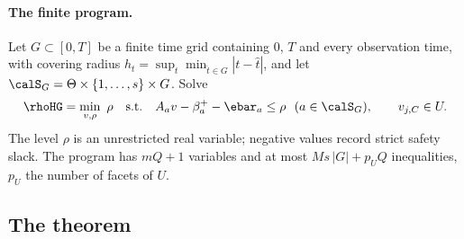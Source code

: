 \paragraph{The finite program.}
Let $G\subset[0,T]$ be a finite time grid containing $0$, $T$ and every observation time, with covering radius $h_t=\sup_{t}\min_{\hat t\in G}|t-\hat t|$, and let $\calS_G=\Theta\times\{1,\dots,s\}\times G$. Solve
\begin{equation}\label{eq:lp}
\rhoHG=\min_{v,\rho}\ \rho\quad\text{s.t.}\quad A_av-\beta^+_a-\ebar_a\le\rho\ \ (a\in\calS_G),\qquad v_{j,C}\in U .
\end{equation}
The level $\rho$ is an unrestricted real variable; negative values record strict safety slack. The program has $mQ+1$ variables and at most $Ms\,|G|+p_UQ$ inequalities, $p_U$ the number of facets of $U$.

\subsection{The theorem}

